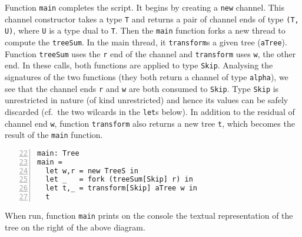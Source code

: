 Function \lstinline|main| completes the script. It begins by creating
a \lstinline|new| channel. This channel constructor takes a type
\lstinline|T| and returns a pair of channel ends of type
\lstinline|(T, U)|, where \lstinline|U| is a type dual to
\lstinline|T|. Then the \lstinline|main| function forks a new thread
to compute the \lstinline|treeSum|. In the main thread, it
\lstinline|transform|s a given tree (\lstinline|aTree|). Function
\lstinline|treeSum| uses the \lstinline|r| end of the channel and
\lstinline|transform| uses \lstinline|w|, the other end. In these
calls, both functions are applied to type \lstinline|Skip|. Analysing
the signatures of the two functions (they both return a channel of
type \lstinline|alpha|), we see that the channel ends \lstinline|r|
and \lstinline|w| are both consumed to \lstinline|Skip|. Type
\lstinline|Skip| is unrestricted in nature (of kind unrestricted) and
hence its values can be safely discarded (cf.\ the two wilcards in
the \lstinline|let|s below). In addition to the residual of channel
end \lstinline|w|, function \lstinline|transform| also returns a new
tree \lstinline|t|, which becomes the result of the \lstinline|main|
function.
%
\begin{lstlisting}[numbers=left,firstnumber=22]
main: Tree
main =
  let w,r = new TreeS in
  let _   = fork (treeSum[Skip] r) in
  let t,_ = transform[Skip] aTree w in
  t
\end{lstlisting}

When run, function \lstinline|main| prints on the console the textual
representation of the tree on the right of the above diagram.


